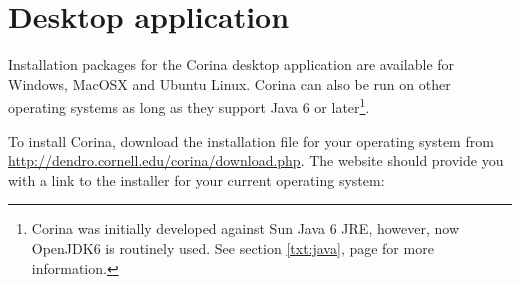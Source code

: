 \section{Desktop application}
\label{txt:desktopinstall}
Installation packages for the Corina desktop application are available for Windows, MacOSX and Ubuntu Linux.  Corina can also be run on other operating systems as long as they support Java 6 or later\footnote{Corina was initially developed against Sun Java 6 JRE, however, now OpenJDK6 is routinely used.  See section \ref{txt:java}, page \pageref{txt:java} for more information.}.

To install Corina, download the installation file for your operating system from \url{http://dendro.cornell.edu/corina/download.php}. The website should provide you with a link to the installer for your current operating system:

